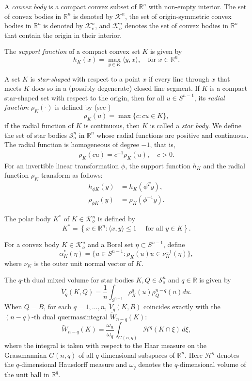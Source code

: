\documentclass[12pt, reqno]{amsart}
\theoremstyle{definition}
\theoremstyle{remark}
\numberwithin{equation}{section}
\newcommand{\Rn}{\mathbb{R}^{n}}
\newcommand{\la}{\langle}
\newcommand{\ra}{\rangle}
\begin{document}
	A \textit{convex body} is a compact convex subset of $ \mathbb{R}^{n} $ with non-empty interior. The set of convex bodies in  $\mathbb{R}^{n} $ is denoted by $ \mathcal{K}^{n}$,  the set of origin-symmetric convex bodies in  $\mathbb{R}^{n} $ is denoted by $ \mathcal{K}_{e}^{n}$, and $ \mathcal{K}_{o}^{n} $ denotes the set of convex bodies in $\mathbb{R}^{n}$ that contain the origin in their interior.
	
	The \textit{support function} of a compact convex set $ K $ is given by 
	$$ h_{K}(x)=\max _{y\in K} \la y , x \ra, \quad \text{for $x\in \Rn$}.$$
	
	A set $K$ is \textit{star-shaped} with respect to a point $x$ if every line through $x$ that meets $K$ does so in a (possibly degenerate) closed line segment.
	 If $K$ is a compact star-shaped set with respect to the origin, then for all $u\in S^{n-1}$, its \textit{radial  function} $ \rho_K(\cdot )$   is defined by (see \cite{Gaedner gtbook,schneiderbook2014})
	\[
	\rho_K(u)=\max\{c:cu\in K\},
	\]
	if the radial function of $K$ is continuous, then $K$ is called a \textit{star body}. We define the set of star bodies $\mathcal{S}^{n}_{o}$ in $\Rn$ whose radial functions are positive and continuous. The radial function is  homogeneous of degree $-1$, that is,
	\begin{align}\label{rad_fun_homo}
		\rho_K(cu)=c^{-1}\rho_K(u), \quad c>0.
	\end{align}
	For an invertible linear transformation $\phi$, the support function $h_K$ and the radial function $\rho_K$ transform as follows:
	\begin{align}
		h_{\phi K}(y) &= h_K(\phi^T y), \label{eq:support-transform} \\
		\rho_{\phi K}(y) &= \rho_K(\phi^{-1} y). \label{eq:radial-transform}
	\end{align}
	
The polar body $ K^{*} $ of $ K\in \mathcal{K}_{o}^{n} $ is defined
by
\begin{equation}
	K^{*}=\left\{x \in \mathbb{R}^{n}: \la x, y \ra \leq 1 \quad \text { for all } y \in K\right\}.
\end{equation}
	
	For a convex body $K \in \mathcal{K}_o^n$ and a Borel set $\eta \subset S^{n-1}$, define
	\[
	\alpha_K^*(\eta) =  \big\{u \in S^{n-1} : \rho_K(u)u \in \nu_K^{-1}(\eta)\big\},
	\]
	where  $\nu_{K}$ is the outer unit normal vector  of $K$.
	
		The $q$-th dual mixed volume for star bodies $K, Q \in \mathcal{S}_{o}^{n}$ and $q \in \mathbb{R}$ is given by
	\[
	\widetilde{V}_{q}(K, Q) = \frac{1}{n} \int_{S^{n-1}} \rho_{K}^{q}(u)\rho_{Q}^{n-q}(u)  du.
	\]   
	 When $Q=B$, for each $q = 1, \ldots, n$,  $\widetilde{V}_{q}(K, B)$ coincides exactly with the $(n - q)$-th dual quermassintegral $\widetilde{W}_{n-q}(K)$: 
	 \[
	 \widetilde{W}_{n-q}(K) = \frac{\omega_n}{\omega_q} \int_{G(n,q)} \mathcal{H}^q(K\cap\xi)\,d\xi,
	 \]
	 where the integral is taken with respect to the Haar measure on the Grassmannian $G(n,q)$ of all $q$-dimensional subspaces of $\mathbb{R}^n$. Here $\mathcal{H}^{q}$ denotes the $q$-dimensional Hausdorff measure and $\omega_q$ denotes the $q$-dimensional volume of the  unit ball in $\mathbb{R}^q$. 
	   
\end{document}
